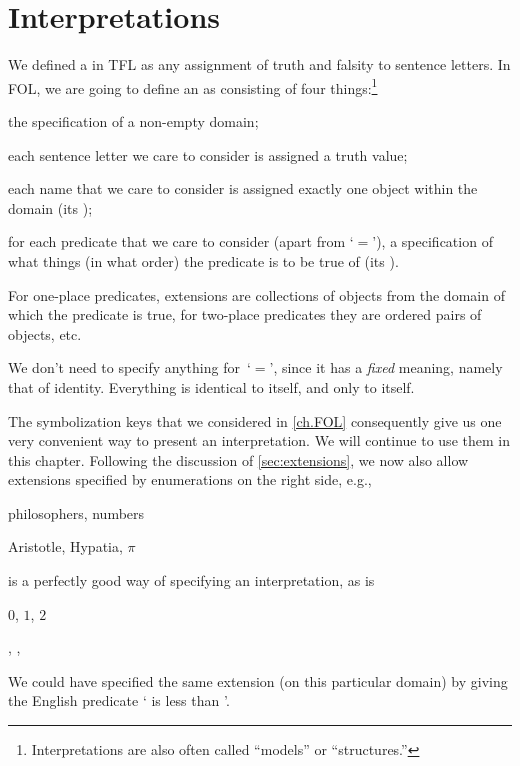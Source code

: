 \section{Interpretations}
We defined a  in TFL as any assignment of truth and
falsity to sentence letters. In FOL, we are going to define an
 as consisting of four
things:\footnote{Interpretations are also often called ``models'' or ``structures.''}
	\begin{compactlist}
		\item the specification of a non-empty domain;
		\item each sentence letter we care to consider is assigned a truth value;
		\item each name that we care to consider is assigned exactly one
		object within the domain (its );
		\item for each predicate that we care to consider (apart from
		`$=$'), a specification of what things (in what order) the
		predicate is to be true of (its ).
	\end{compactlist}
For one-place predicates, extensions are collections of objects from
the domain of which the predicate is true, for two-place predicates
they are ordered pairs of objects, etc.

We don't need to specify anything for~`$=$', since it has a
\emph{fixed} meaning, namely that of identity. Everything is identical
to itself, and only to itself. 

The symbolization keys that we considered in \cref{ch.FOL} consequently give us one very convenient way to present an interpretation. We will continue to use them in this chapter. Following the discussion of \cref{sec:extensions}, we now also allow extensions specified by enumerations on the right side, e.g.,
\begin{ekey}
	\item[\text{domain}] philosophers, numbers
	\item[\atom{H}{x}] Aristotle, Hypatia, $\pi$
\end{ekey}
is a perfectly good way of specifying an interpretation, as is
\begin{ekey}
	\item[\text{domain}] $0$, $1$, $2$
	\item[\atom{L}{x,y}] , , 
\end{ekey}
We could have specified the same extension (on this particular domain) by giving the English predicate ` is less than '.


